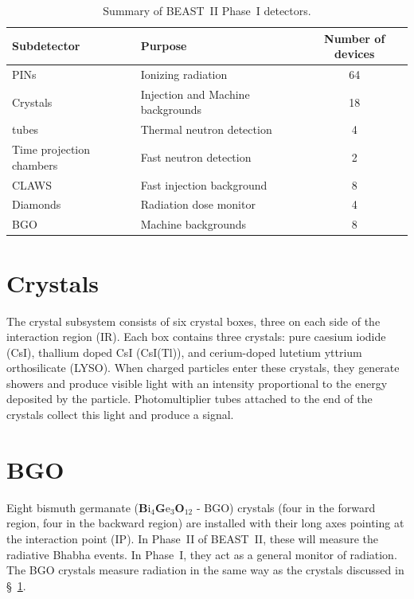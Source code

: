 %


\begin{table}[ht]
	\centering
	\begin{tabular}{ llc }
		Subdetector	&	Purpose				&	Number of devices	\\	\hline \hline
		PINs		&	Ionizing radiation		&	64	\\	
		Crystals	&	Injection and 
					Machine backgrounds		&	18	\\	
		\He tubes	&	Thermal neutron detection	&	4	\\	
		Time projection
		 chambers	&	Fast neutron detection		&	2	\\	
		CLAWS		&	Fast injection background	&	8	\\	
		Diamonds	&	Radiation dose monitor		&	4	\\	
		BGO		&	Machine backgrounds		&	8	\\	\hline
	\end{tabular}
	\caption[Summary of BEAST~II Phase~I detectors]{Summary of BEAST~II Phase~I detectors.}
	\label{tab:beastPhase1}
\end{table}


\section{Crystals}
\label{sec:CSI}

	The crystal subsystem consists of six crystal boxes, three on each side of the interaction region (IR). Each box contains three crystals: pure caesium iodide (CsI), thallium doped CsI (CsI(Tl)), and cerium-doped lutetium yttrium orthosilicate (LYSO). When charged particles enter these crystals, they generate showers and produce visible light with an intensity proportional to the energy deposited by the particle. Photomultiplier tubes attached to the end of the crystals collect this light and produce a signal.


\section{BGO}

	Eight bismuth germanate (\textbf{B}i$_4$\textbf{G}e$_3$\textbf{O}$_{12}$ - BGO) crystals (four in the forward region, four in the backward region) are installed with their long axes pointing at the interaction point (IP). In Phase~II of BEAST~II, these will measure the radiative Bhabha events. In Phase~I, they act as a general monitor of radiation. The BGO crystals measure radiation in the same way as the crystals discussed in \S~\ref{sec:CSI}. 


